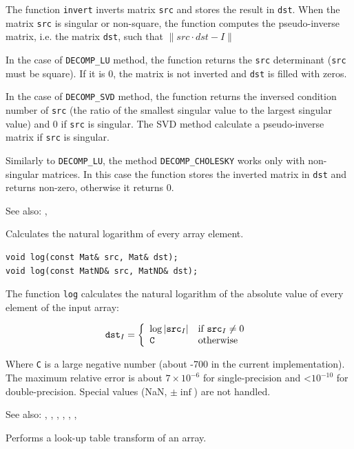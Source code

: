 The function \texttt{invert} inverts matrix \texttt{src} and stores the result in \texttt{dst}.
When the matrix \texttt{src} is singular or non-square, the function computes the pseudo-inverse matrix, i.e. the matrix \texttt{dst}, such that $\|src \cdot dst - I\|$

In the case of \texttt{DECOMP\_LU} method, the function returns the \texttt{src} determinant (\texttt{src} must be square). If it is 0, the matrix is not inverted and \texttt{dst} is filled with zeros.

In the case of \texttt{DECOMP\_SVD} method, the function returns the inversed condition number of \texttt{src} (the ratio of the smallest singular value to the largest singular value) and 0 if \texttt{src} is singular. The SVD method calculate a pseudo-inverse matrix if \texttt{src} is singular.

Similarly to \texttt{DECOMP\_LU}, the method \texttt{DECOMP\_CHOLESKY} works only with non-singular matrices. In this case the function stores the inverted matrix in \texttt{dst} and returns non-zero, otherwise it returns 0.

See also: , 


\label{log}
Calculates the natural logarithm of every array element.

\begin{lstlisting}
void log(const Mat& src, Mat& dst);
void log(const MatND& src, MatND& dst);
\end{lstlisting}
\begin{description}
\end{description}

The function \texttt{log} calculates the natural logarithm of the absolute value of every element of the input array:

\[
\texttt{dst}_I = \left\{ \begin{array}{l l} \log |\texttt{src}_I| & \mbox{if $\texttt{src}_I \ne 0$ }\\ \texttt{C} & \mbox{otherwise}\\ \end{array} \right.
\]

Where \texttt{C} is a large negative number (about -700 in the current implementation).
The maximum relative error is about $7 \times 10^{-6}$ for single-precision and <$10^{-10}$ for double-precision. Special values (NaN, $\pm \inf$) are not handled.

See also: , , , , , , 


\label{LUT}
Performs a look-up table transform of an array.

